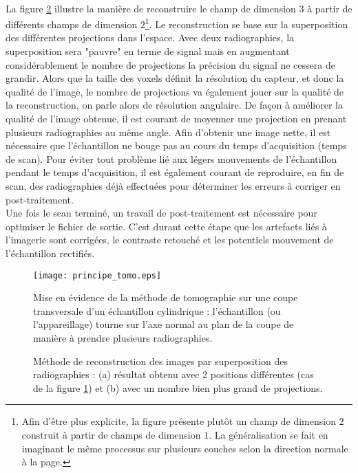 			\\La figure \ref{fig03:reconstruction_tomo} illustre la manière de reconstruire le champ de dimension $3$ à partir de différents champs de dimension $2$\footnote{Afin d'être plus explicite, la figure présente plutôt un champ de dimension $2$ construit à partir de champs de dimension $1$. La généralisation se fait en imaginant le même processus sur plusieurs couches selon la direction normale à la page.}. Le reconstruction se base sur la superposition des différentes projections dans l'espace. Avec deux radiographies, la superposition sera "pauvre" en terme de signal mais en augmentant considérablement le nombre de projections la précision du signal ne cessera de grandir. Alors que la taille des voxels définit la résolution du capteur, et donc la qualité de l'image, le nombre de projections va également jouer sur la qualité de la reconstruction, on parle alors de résolution angulaire. De façon à améliorer la qualité de l'image obtenue, il est courant de moyenner une projection en prenant plusieurs radiographies au même angle. Afin d'obtenir une image nette, il est nécessaire que l'échantillon ne bouge pas au cours du temps d'acquisition (temps de scan). Pour éviter tout problème lié aux légers mouvements de l'échantillon pendant le temps d'acquisition, il est également courant de reproduire, en fin de scan, des radiographies déjà effectuées pour déterminer les erreurs à corriger en post-traitement.
			\\Une fois le scan terminé, un travail de post-traitement est nécessaire pour optimiser le fichier de sortie. C'est durant cette étape que les artefacts liés à l'imagerie sont corrigées, le contraste retouché et les potentiels mouvement de l'échantillon rectifiés.
			\begin{figure}\centering
				\texttt{[image: principe\_tomo.eps]}
				\caption{\label{fig03:principe_tomo}Mise en évidence de la méthode de tomographie sur une coupe transversale d'un échantillon cylindrique : l'échantillon (ou l'appareillage) tourne sur l'axe normal au plan de la coupe de manière à prendre plusieurs radiographies.}
			\end{figure}
			\begin{figure}\centering
				\hspace{1cm}
				\caption{\label{fig03:reconstruction_tomo}Méthode de reconstruction des images par superposition des radiographies : (a) résultat obtenu avec 2 positions différentes (cas de la figure \ref{fig03:principe_tomo}) et (b) avec un nombre bien plus grand de projections.}
			\end{figure}
